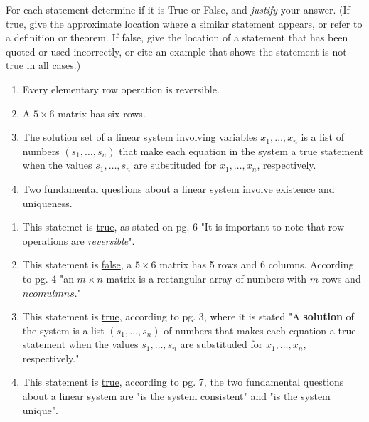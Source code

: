 \documentclass{../mathhomework}
\begin{document}
\begin{problem}[1.1\#23]
    For each statement determine if it is True or False, and \textit{justify} your answer. (If true, give the approximate location where a similar statement appears, or refer to a definition or theorem. 
    If false, give the location of a statement that has been quoted or used incorrectly, or cite an example that shows the statement is not true in all cases.)
    \begin{enumerate}[label=(\alph*)]
        \item Every elementary row operation is reversible.
        \item A $5 \times 6$ matrix has six rows.
        \item The solution set of a linear system involving variables $x_1,\ldots,x_n$ is a list of numbers $(s_1, \ldots, s_n)$ that make each equation in the system a true statement when the values $s_1,\ldots,s_n$ are substituded for $x_1,\ldots,x_n$, respectively.
        \item Two fundamental questions about a linear system involve existence and uniqueness.
    \end{enumerate}

    \begin{solution}
        \begin{enumerate}[label=(\alph*)]
            \item This statemet is \underline{true}, as stated on pg. 6 "It is important to note that row operations are \textit{reversible}".
            \item This statement is \underline{false}, a $5 \times 6$ matrix has 5 rows and 6 columns. According to pg. 4 "an $m \times n$ matrix is a rectangular array of numbers with $m$ rows and $n comulmns$."
            \item This statement is \underline{true}, according to pg. 3, where it is stated "A \textbf{solution} of the system is a list $(s_1, \ldots, s_n)$ of numbers that makes each equation a true statement when the values $s_1,\ldots,s_n$ are substituded for $x_1,\ldots,x_n$, respectively."
            \item This statement is \underline{true}, according to pg. 7, the two fundamental questions about a linear system are "is the system consistent" and "is the system unique".
        \end{enumerate}
    \end{solution}
\end{problem}
\end{document}
